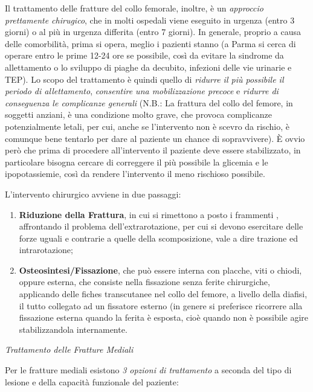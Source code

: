 \documentclass[]{article}
\begin{document}
Il trattamento delle fratture del collo femorale, inoltre, è un
\emph{approccio prettamente chirugico}, che in molti ospedali viene
eseguito in urgenza (entro 3 giorni) o al più in urgenza differita
(entro 7 giorni). In generale, proprio a causa delle comorbilità, prima
si opera, meglio i pazienti stanno (a Parma si cerca di operare entro le
prime 12-24 ore se possibile, così da evitare la sindrome da
allettamento o lo sviluppo di piaghe da decubito, infezioni delle vie
urinarie e TEP). Lo scopo del trattamento è quindi quello di
\emph{ridurre il più possibile il periodo di allettamento},
\emph{consentire una mobilizzazione precoce} e \emph{ridurre di
conseguenza le complicanze generali} (N.B.: La frattura del collo del
femore, in soggetti anziani, è una condizione molto grave, che provoca
complicanze potenzialmente letali, per cui, anche se l'intervento non è
scevro da rischio, è comunque bene tentarlo per dare al paziente un
chance di sopravvivere). È ovvio però che prima di procedere
all'intervento il paziente deve essere stabilizzato, in particolare
bisogna cercare di correggere il più possibile la glicemia e le
ipopotassiemie, così da rendere l'intervento il meno rischioso
possibile.

L'intervento chirurgico avviene in due passaggi:

\begin{enumerate}
\def\labelenumi{\arabic{enumi}.}
\item
  \textbf{Riduzione della Frattura}, in cui si rimettono a posto i
  frammenti , affrontando il problema dell'extrarotazione, per cui si
  devono esercitare delle forze uguali e contrarie a quelle della
  scomposizione, vale a dire trazione ed intrarotazione;
\item
  \textbf{Osteosintesi/Fissazione}, che può essere interna con placche,
  viti o chiodi, oppure esterna, che consiste nella fissazione senza
  ferite chirurgiche, applicando delle fiches transcutanee nel collo del
  femore, a livello della diafisi, il tutto collegato ad un fissatore
  esterno (in genere si preferisce ricorrere alla fissazione esterna
  quando la ferita è esposta, cioè quando non è possibile agire
  stabilizzandola internamente.
\end{enumerate}

\emph{Trattamento delle Fratture Mediali}

Per le fratture mediali esistono \emph{3 opzioni di trattamento} a
seconda del tipo di lesione e della capacità funzionale del paziente:
\end{document}
